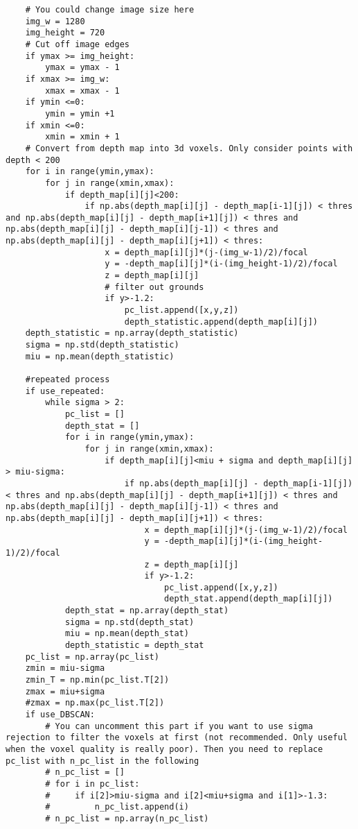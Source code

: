 \begin{verbatim}
    # You could change image size here
    img_w = 1280
    img_height = 720
    # Cut off image edges
    if ymax >= img_height:
        ymax = ymax - 1
    if xmax >= img_w:
        xmax = xmax - 1
    if ymin <=0:
        ymin = ymin +1
    if xmin <=0:
        xmin = xmin + 1
    # Convert from depth map into 3d voxels. Only consider points with depth < 200
    for i in range(ymin,ymax):
        for j in range(xmin,xmax):
            if depth_map[i][j]<200:
                if np.abs(depth_map[i][j] - depth_map[i-1][j]) < thres and np.abs(depth_map[i][j] - depth_map[i+1][j]) < thres and np.abs(depth_map[i][j] - depth_map[i][j-1]) < thres and np.abs(depth_map[i][j] - depth_map[i][j+1]) < thres:
                    x = depth_map[i][j]*(j-(img_w-1)/2)/focal
                    y = -depth_map[i][j]*(i-(img_height-1)/2)/focal
                    z = depth_map[i][j]
                    # filter out grounds
                    if y>-1.2:
                        pc_list.append([x,y,z])
                        depth_statistic.append(depth_map[i][j])
    depth_statistic = np.array(depth_statistic)
    sigma = np.std(depth_statistic)
    miu = np.mean(depth_statistic)

    #repeated process
    if use_repeated:
        while sigma > 2:
            pc_list = []
            depth_stat = []
            for i in range(ymin,ymax):
                for j in range(xmin,xmax):
                    if depth_map[i][j]<miu + sigma and depth_map[i][j] > miu-sigma:
                        if np.abs(depth_map[i][j] - depth_map[i-1][j]) < thres and np.abs(depth_map[i][j] - depth_map[i+1][j]) < thres and np.abs(depth_map[i][j] - depth_map[i][j-1]) < thres and np.abs(depth_map[i][j] - depth_map[i][j+1]) < thres:
                            x = depth_map[i][j]*(j-(img_w-1)/2)/focal
                            y = -depth_map[i][j]*(i-(img_height-1)/2)/focal
                            z = depth_map[i][j]
                            if y>-1.2:
                                pc_list.append([x,y,z])
                                depth_stat.append(depth_map[i][j])
            depth_stat = np.array(depth_stat)
            sigma = np.std(depth_stat)
            miu = np.mean(depth_stat)
            depth_statistic = depth_stat
    pc_list = np.array(pc_list)
    zmin = miu-sigma
    zmin_T = np.min(pc_list.T[2])
    zmax = miu+sigma
    #zmax = np.max(pc_list.T[2])
    if use_DBSCAN:
        # You can uncomment this part if you want to use sigma rejection to filter the voxels at first (not recommended. Only useful when the voxel quality is really poor). Then you need to replace pc_list with n_pc_list in the following
        # n_pc_list = []
        # for i in pc_list:
        #     if i[2]>miu-sigma and i[2]<miu+sigma and i[1]>-1.3:
        #         n_pc_list.append(i)
        # n_pc_list = np.array(n_pc_list)


\end{verbatim}
